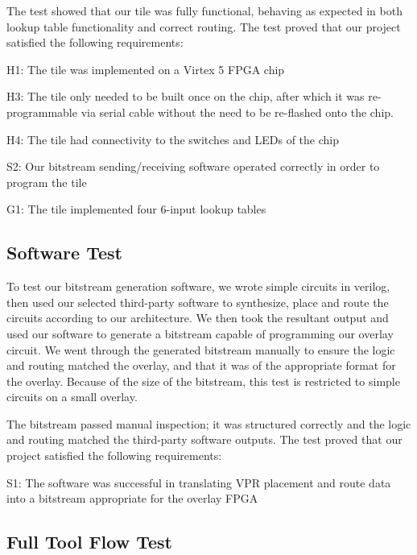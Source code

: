The test showed that our tile was fully functional, behaving as expected in both lookup table functionality and correct routing.
The test proved that our project satisfied the following requirements:
\begin{itemlist}
	\item H1: The tile was implemented on a Virtex 5 FPGA chip
	\item H3: The tile only needed to be built once on the chip, after which it was re-programmable via serial cable without the need to be re-flashed onto the chip.
	\item H4: The tile had connectivity to the switches and LEDs of the chip
	\item S2: Our bitstream sending/receiving software operated correctly in order to program the tile
	\item G1: The tile implemented four 6-input lookup tables
\end{itemlist}

\subsection{Software Test}

To test our bitstream generation software, we wrote simple circuits in verilog, then used our selected third-party software to synthesize, place and route the circuits according to our architecture.
We then took the resultant output and used our software to generate a bitstream capable of programming our overlay circuit.
We went through the generated bitstream manually to ensure the logic and routing matched the overlay, and that it was of the appropriate format for the overlay.
Because of the size of the bitstream, this test is restricted to simple circuits on a small overlay.

The bitstream passed manual inspection; it was structured correctly and the logic and routing matched the third-party software outputs.
The test proved that our project satisfied the following requirements:
\begin{itemlist}
	\item S1: The software was successful in translating VPR placement and route data into a bitstream appropriate for the overlay FPGA
\end{itemlist}

\subsection{Full Tool Flow Test}

